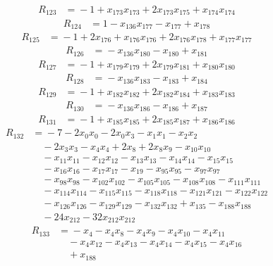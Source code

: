 \begin{align*}
R_{123}&={}-1 +x_{173}x_{173} +2x_{173}x_{175} +x_{174}x_{174}
\end{align*}
\begin{align*}
R_{124}&={}1 -x_{136}x_{177} -x_{177} +x_{178}
\end{align*}
\begin{align*}
R_{125}&={}-1 +2x_{176} +x_{176}x_{176} +2x_{176}x_{178} +x_{177}x_{177}
\end{align*}
\begin{align*}
R_{126}&={}-x_{136}x_{180} -x_{180} +x_{181}
\end{align*}
\begin{align*}
R_{127}&={}-1 +x_{179}x_{179} +2x_{179}x_{181} +x_{180}x_{180}
\end{align*}
\begin{align*}
R_{128}&={}-x_{136}x_{183} -x_{183} +x_{184}
\end{align*}
\begin{align*}
R_{129}&={}-1 +x_{182}x_{182} +2x_{182}x_{184} +x_{183}x_{183}
\end{align*}
\begin{align*}
R_{130}&={}-x_{136}x_{186} -x_{186} +x_{187}
\end{align*}
\begin{align*}
R_{131}&={}-1 +x_{185}x_{185} +2x_{185}x_{187} +x_{186}x_{186}
\end{align*}
\begin{align*}
R_{132}&={}-7 -2x_{0}x_{0} -2x_{0}x_{3} -x_{1}x_{1} -x_{2}x_{2}\\
&\quad{}-2x_{3}x_{3} -x_{4}x_{4} +2x_{8} +2x_{8}x_{9} -x_{10}x_{10}\\
&\quad{}-x_{11}x_{11} -x_{12}x_{12} -x_{13}x_{13} -x_{14}x_{14} -x_{15}x_{15}\\
&\quad{}-x_{16}x_{16} -x_{17}x_{17} -x_{19} -x_{95}x_{95} -x_{97}x_{97}\\
&\quad{}-x_{98}x_{98} -x_{102}x_{102} -x_{105}x_{105} -x_{108}x_{108} -x_{111}x_{111}\\
&\quad{}-x_{114}x_{114} -x_{115}x_{115} -x_{118}x_{118} -x_{121}x_{121} -x_{122}x_{122}\\
&\quad{}-x_{126}x_{126} -x_{129}x_{129} -x_{132}x_{132} +x_{135} -x_{188}x_{188}\\
&\quad{}-24x_{212} -32x_{212}x_{212}
\end{align*}
\begin{align*}
R_{133}&={}-x_{4} -x_{4}x_{8} -x_{4}x_{9} -x_{4}x_{10} -x_{4}x_{11}\\
&\quad{}-x_{4}x_{12} -x_{4}x_{13} -x_{4}x_{14} -x_{4}x_{15} -x_{4}x_{16}\\
&\quad{}+x_{188}
\end{align*}
